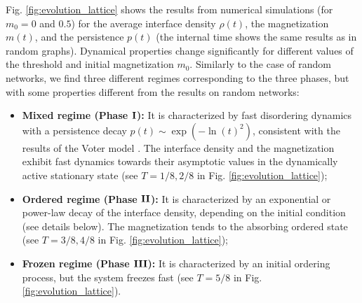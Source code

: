 Fig. \ref{fig:evolution_lattice} shows the results from numerical simulations (for $m_0 = 0$ and $0.5$) for the average interface density $\rho(t)$, the magnetization $m(t)$, and the persistence $p(t)$ (the internal time shows the same results as in random graphs). Dynamical properties change significantly for different values of the threshold and initial magnetization $m_0$. Similarly to the case of random networks, we find three different regimes corresponding to the three phases, but with some properties different from the results on  random networks:
\begin{itemize}
	\item \textbf{Mixed regime (Phase ${\rm {\bf I}}$):} It is characterized by fast disordering dynamics with a persistence decay $p(t) \sim \exp(- \ln(t)^2)$, consistent with the results of the Voter model \cite{ben-naim-1996}. The interface density and the magnetization exhibit fast dynamics towards their asymptotic values in the dynamically active stationary state (see $T = 1/8,2/8$ in Fig. \ref{fig:evolution_lattice});
	\item \textbf{Ordered regime (Phase ${\rm {\bf II}}$):} It is characterized by an exponential or power-law decay of the interface density, depending on the initial condition (see details below). The magnetization tends to the absorbing ordered state (see $T = 3/8,4/8$ in Fig. \ref{fig:evolution_lattice});
	\item \textbf{Frozen regime (Phase ${\rm {\bf III}}$):} It is characterized by an initial ordering process, but the system freezes fast (see $T = 5/8$ in Fig. \ref{fig:evolution_lattice}).
\end{itemize}

